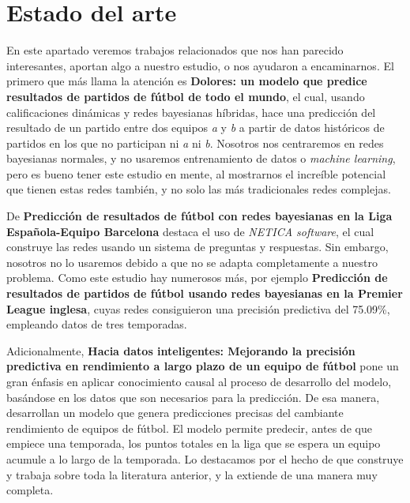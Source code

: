 \chapter{Estado del arte}
En este apartado veremos trabajos relacionados que nos han parecido interesantes, 
aportan algo a nuestro estudio, o nos ayudaron a encaminarnos. El primero que más 
llama la atención es \textbf{Dolores: un modelo que predice resultados de partidos 
de fútbol de todo el mundo}\cite{dolores}, el cual, usando calificaciones dinámicas 
y redes bayesianas híbridas, hace una predicción del resultado de un partido entre dos 
equipos  \textit{a} y \textit{b} a partir de datos históricos de partidos 
en los que no participan ni \textit{a} ni \textit{b}. Nosotros nos 
centraremos en redes bayesianas normales, y no usaremos entrenamiento de datos o 
\textit{machine learning}, pero es bueno tener este estudio en mente, al mostrarnos 
el increíble potencial que tienen estas redes también, y no solo las más tradicionales 
redes complejas.

De \textbf{Predicción de resultados de fútbol con redes bayesianas en la
Liga Española-Equipo Barcelona}\cite{prediction-barcelona} destaca el uso de 
\textit{NETICA software}\cite{netica}, el cual construye las redes usando un sistema de 
preguntas y respuestas. Sin embargo, nosotros no lo usaremos 
debido a que no se adapta completamente a nuestro problema. Como este estudio hay 
numerosos más, por ejemplo \textbf{Predicción de resultados de partidos de fútbol 
usando redes bayesianas en la Premier League inglesa}\cite{razali-2017}, 
cuyas redes consiguieron una precisión predictiva del 75.09\%, empleando datos de 
tres temporadas.

Adicionalmente, \textbf{Hacia datos inteligentes: Mejorando la precisión predictiva 
en rendimiento a largo plazo de un equipo de fútbol}\cite{smart-data} pone un gran énfasis 
en aplicar conocimiento causal al proceso de desarrollo del modelo, basándose 
en los datos que son necesarios para la predicción. De esa manera, desarrollan un modelo 
que genera predicciones precisas del cambiante rendimiento de equipos de fútbol. El 
modelo permite predecir, antes de que empiece una temporada, los puntos totales en 
la liga que se espera un equipo acumule a lo largo de la temporada. Lo 
destacamos por el hecho de que construye y trabaja sobre toda la literatura anterior, y la extiende 
de una manera muy completa.


